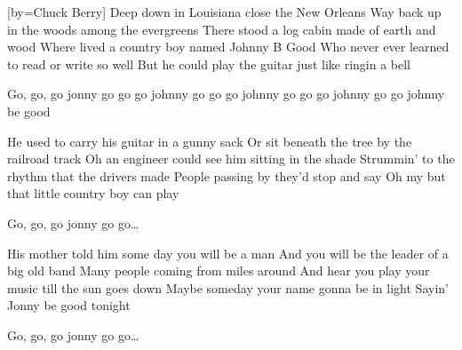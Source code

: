 [by={Chuck Berry}]
\beginverse
Deep down in Louisiana close the New Orleans
Way back up in the woods among the evergreens
There stood a log cabin made of earth and wood
Where lived a country boy named Johnny B Good
Who never ever learned to read or write so well
But he could play the guitar just like ringin a bell
\endverse

\beginchorus
Go, go, go jonny go go
go johnny go go
go johnny go go
go johnny go go
johnny be good
\endchorus

\beginverse 
He used to carry his guitar in a gunny sack
Or sit beneath the tree by the railroad track
Oh an engineer could see him sitting in the shade
Strummin' to the rhythm that the drivers made
People passing by they'd stop and say
Oh my but that little country boy can play
\endverse

\beginchorus
Go, go, go jonny go go\dots
\endchorus
 
\beginverse
His mother told him some day you will be a man
And you will be the leader of a big old band
Many people coming from miles around
And hear you play your music till the sun goes down
Maybe someday your name gonna be in light
Sayin' Jonny be good tonight
\endverse

\beginchorus
Go, go, go jonny go go\dots
\endchorus
\endsong
